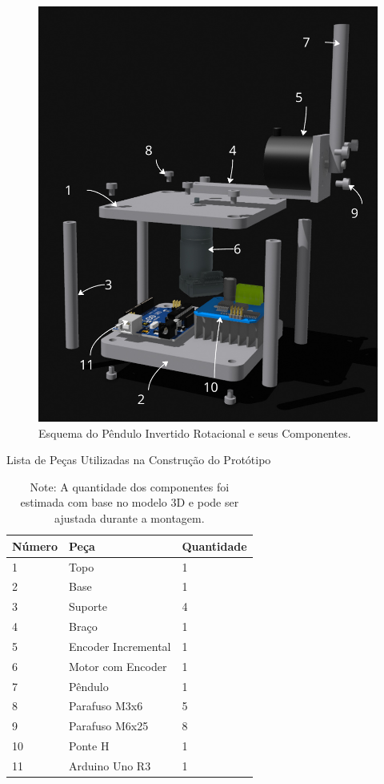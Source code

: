 \documentclass[9pt,a4paper,twocolumn,twoside]{tau-class/tau}
\begin{document}
    \begin{figure}[H]
        \centering
        \includegraphics[width=0.8\columnwidth]{figures/itens.png}
        \caption{Esquema do Pêndulo Invertido Rotacional e seus Componentes.}
        \label{fig:itens}
    \end{figure}
    
    \begin{table}[H]
        \centering
        \caption{Lista de Peças Utilizadas na Construção do Protótipo}
        \label{tab:lista_pecas}
        \begin{tabular}{lll}
            \toprule
            \textbf{Número} & \textbf{Peça} & \textbf{Quantidade} \\
            \midrule
            1  & Topo                    & 1  \\
            2  & Base                    & 1  \\
            3  & Suporte                 & 4  \\
            4  & Braço                   & 1  \\
            5  & Encoder Incremental     & 1  \\
            6  & Motor com Encoder       & 1  \\
            7  & Pêndulo                 & 1  \\
            8  & Parafuso M3x6           & 5  \\
            9  & Parafuso M6x25          & 8  \\
            10 & Ponte H                 & 1  \\
            11 & Arduino Uno R3          & 1  \\
            \bottomrule
        \end{tabular}
        \caption*{Note: A quantidade dos componentes foi estimada com base no modelo 3D e pode ser ajustada durante a montagem.}
    \end{table}
    
\end{document}
